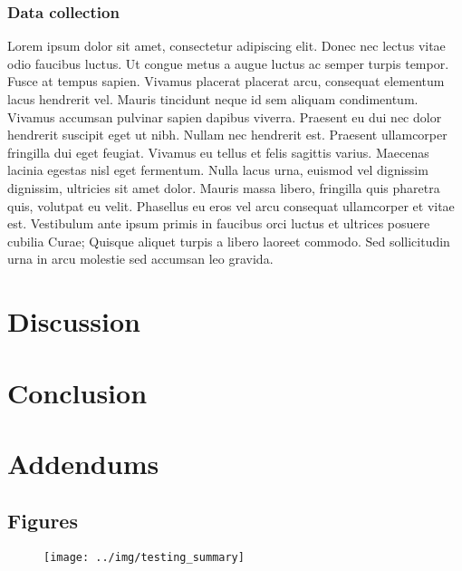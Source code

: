 \documentclass{article}
\begin{document}
\subsubsection{Data collection}
Lorem ipsum dolor sit amet, consectetur adipiscing elit. Donec nec lectus vitae odio faucibus luctus. Ut congue metus a augue luctus ac semper turpis tempor. Fusce at tempus sapien. Vivamus placerat placerat arcu, consequat elementum lacus hendrerit vel. Mauris tincidunt neque id sem aliquam condimentum. Vivamus accumsan pulvinar sapien dapibus viverra. Praesent eu dui nec dolor hendrerit suscipit eget ut nibh. Nullam nec hendrerit est. Praesent ullamcorper fringilla dui eget feugiat. Vivamus eu tellus et felis sagittis varius. Maecenas lacinia egestas nisl eget fermentum. Nulla lacus urna, euismod vel dignissim dignissim, ultricies sit amet dolor. Mauris massa libero, fringilla quis pharetra quis, volutpat eu velit. Phasellus eu eros vel arcu consequat ullamcorper et vitae est. Vestibulum ante ipsum primis in faucibus orci luctus et ultrices posuere cubilia Curae; Quisque aliquet turpis a libero laoreet commodo. Sed sollicitudin urna in arcu molestie sed accumsan leo gravida.

\section{Discussion}
\label{sec:discussion}

\section{Conclusion}
\label{sec:conclusion}

\section{Addendums}
\label{sec:addendums}

\subsection{Figures}
\label{sec:figures}

\begin{figure}[H]
  \centering
  \texttt{[image: ../img/testing\_summary]}
  \label{fig:usage}
\end{figure}


\newpage
{}


\end{document}
